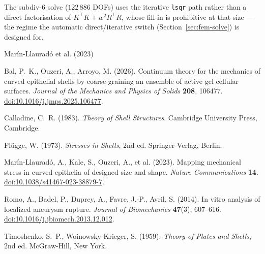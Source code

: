 \documentclass[11pt]{article}
\begin{document}
The subdiv-6 solve ($122\,886$ DOFs) uses the iterative \texttt{lsqr} path rather than a
direct factorisation of $K^\top K+w^2R^\top R$, whose fill-in is prohibitive at that
size --- the regime the automatic direct/iterative switch
(Section~\ref{sec:fem-solve}) is designed for.

\begin{thebibliography}{Mar\'in-Llaurad\'o et al. (2023)}

Bal, P.~K., Ouzeri, A., Arroyo, M. (2026).
Continuum theory for the mechanics of curved epithelial shells by
coarse-graining an ensemble of active gel cellular surfaces.
\emph{Journal of the Mechanics and Physics of Solids} \textbf{208}, 106477.
\href{https://doi.org/10.1016/j.jmps.2025.106477}{doi:10.1016/j.jmps.2025.106477}.

Calladine, C.~R. (1983).
\emph{Theory of Shell Structures}.
Cambridge University Press, Cambridge.

Fl\"ugge, W. (1973).
\emph{Stresses in Shells}, 2nd ed.
Springer-Verlag, Berlin.

Mar\'in-Llaurad\'o, A., Kale, S., Ouzeri, A., et al. (2023).
Mapping mechanical stress in curved epithelia of designed size and shape.
\emph{Nature Communications} \textbf{14}.
\href{https://doi.org/10.1038/s41467-023-38879-7}{doi:10.1038/s41467-023-38879-7}.

Romo, A., Badel, P., Duprey, A., Favre, J.-P., Avril, S. (2014).
In vitro analysis of localized aneurysm rupture.
\emph{Journal of Biomechanics} \textbf{47}(3), 607--616.
\href{https://doi.org/10.1016/j.jbiomech.2013.12.012}{doi:10.1016/j.jbiomech.2013.12.012}.

Timoshenko, S.~P., Woinowsky-Krieger, S. (1959).
\emph{Theory of Plates and Shells}, 2nd ed.
McGraw-Hill, New York.

\end{thebibliography}
\end{document}
